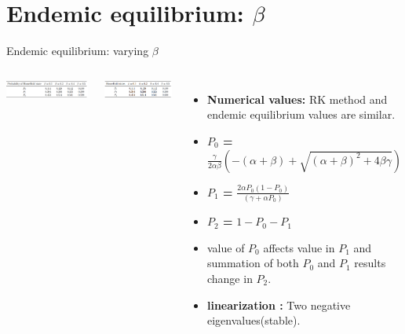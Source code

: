 \documentclass[smaller,aspectratio=169, toc=bibliography]{beamer}
\begin{document}
\section*{Endemic equilibrium: $\beta$ }
\begin{frame}{Endemic equilibrium: varying $\beta$}     
\begin{columns}[c]   
            \begin{center}
                \includegraphics[width=\linewidth]{screenshot/11betaRK_PK.png}
                \caption{Runge-Kutta Method : $\beta$}
            \end{center} 
              \begin{center}
                \includegraphics[width=\linewidth]{screenshot/14betaEE_PK.png}
                \caption{Equilibrium: $\beta$}
            \end{center} 
            \begin{itemize}
\item \textbf{Numerical values: } RK method and endemic equilibrium values are similar.
  
\item \textbf{$P_0$ = } \( \frac{\gamma}{2\alpha\beta}(-( \alpha + \beta ) + \sqrt{( \alpha + \beta )^2 + 4\beta\gamma}) \)
\item \textbf{$P_1$ = } \( \frac{2\alpha P_0(1 - P_0)}{(\gamma + \alpha P_0 )}\) 
\item \textbf{$P_2$ = } $1 - P_0 - P_1$ 
\item value of $P_0$ affects value in $P_1$ and summation of both $P_0$ and $P_1$ results change in $P_2$.
\item \textbf{linearization : } Two negative eigenvalues(stable). 
            \end{itemize}
\end{columns}
\end{frame}
\end{document}
